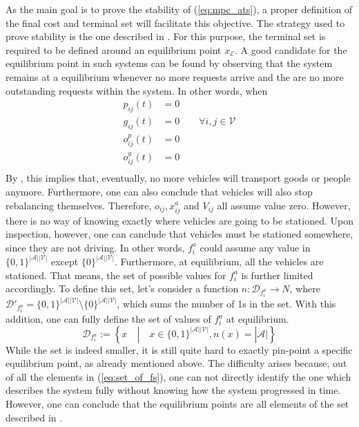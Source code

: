 As the main goal is to prove the stability of (\ref{eq:mpc_ats}), a proper definition of the final cost and terminal set will facilitate this objective. The strategy used to prove stability is the one described in . For this purpose, the terminal set is required to be defined around an equilibrium point $x_\mathcal{E}$. A good candidate for the equilibrium point in such systems can be found by observing that the system remains at a equilibrium whenever no more requests arrive and the are no more outstanding requests within the system. In other words, when 
\begin{align*}
	p_{ij}(t) &=0 \\
	g_{ij}(t) &=0\quad\quad \forall i,j\in\mathcal{V}\\
	o^p_{ij}(t) &=0\\
	o^g_{ij}(t) &=0\\
\end{align*}
By , this implies that, eventually, no more vehicles will transport goods or people anymore. Furthermore, one can also conclude that vehicles will also stop rebalancing themselves. Therefore, $o_{ij}, x_{ij}^a$ and $V_{ij}$ all assume value zero. However, there is no way of knowing exactly where vehicles are going to be stationed. Upon inspection, however, one can canclude that vehicles must be stationed somewhere, since they are not driving. In other words, $f^a_{i}$ could assume any value in $\{0,1\}^{|\mathcal{A}||\mathcal{V}|} $ except $ \{0\}^{|\mathcal{A}||\mathcal{V}|}$. Furthermore, at equilibrium, all the vehicles are stationed. That means, the set of possible values for  $f^a_{i}$ is further limited accordingly. To define this set, let's consider a function $n : \mathcal{D}_{f^a_{i}} \rightarrow N$, where $\mathcal{D}'_{f^a_{i}}  = \{0,1\}^{|\mathcal{A}||\mathcal{V}|} \setminus \{0\}^{|\mathcal{A}||\mathcal{V}|}$, which sums the number of 1s in the set. With this addition, one can fully define the set of values of $f^a_{i}$  at equilibrium. 
\begin{equation}
\mathcal{D}_{f^a_{i}} := 	\left\{
	x   \quad | \quad x \in \{0,1\}^{|\mathcal{A}||\mathcal{V}|},  n(x) = |\mathcal{A}|
	\right\}\label{eq:set_of_fs}
\end{equation}
While the set is indeed smaller, it is still quite hard to exactly pin-point a specific equilibrium point, as already mentioned above. The difficulty arises because, out of all the elements in (\ref{eq:set_of_fs}), one can not directly identify the one which describes the system fully without knowing how the system progressed in time. However, one can conclude that the equilibrium points are all elements of the set described in . 
